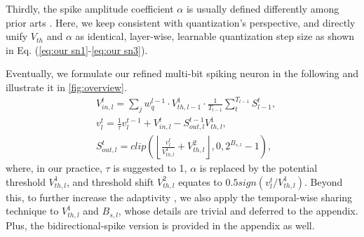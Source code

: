 Thirdly, the spike amplitude coefficient $\alpha$ is usually defined differently among prior arts  \cite{shen2024conventional, guo2024ternary, xiao2024multi}. Here, we keep consistent with quantization's perspective, and directly unify $V_{th}$ and $\alpha$ as identical, layer-wise, learnable quantization step size as shown in Eq. (\ref{eq:our sn1}-\ref{eq:our sn3}).

Eventually, we formulate our refined multi-bit spiking neuron in the following and illustrate it in  \cref{fig:overview}.
\begin{align}
    &V_{in,l}^t=\sum_j w^{l-1}_q \cdot V^1_{th,l-1}\cdot \frac{1}{T_{l-1}} \sum_t^{T_{l-1}}  S_{l-1}^t,\label{eq:our sn1}\\
&v^t_l=\frac{1}{\tau}v_l^{t-1}+ V^t_{in,l}- S^{t-1}_{out,l}V^1_{th,l},\label{eq:our sn2}
\\
&S^t_{out,l}= clip(\left \lfloor\frac{v^t_l}{V^1_{th, l}}+V^2_{th, l}\right \rfloor, 0, 2^{B_{s,l}}-1 ),\label{eq:our sn3}
\end{align}
where, in our practice, $\tau$ is suggested to 1, $\alpha$ is replaced by the potential threshold $V^1_{th,l}$, and  threshold shift $V^2_{th, l}$ equates to  $0.5sign(v^t_l/V^1_{th,l})$. Beyond this, to further increase the adaptivity \cite{yao2022glif, xing2024spikelm}, we also apply the temporal-wise sharing technique to $V_{th,l}^1$ and $B_{s,l}$, whose details are trivial and deferred to the appendix. Plus, the bidirectional-spike version is provided in the appendix as well. 






